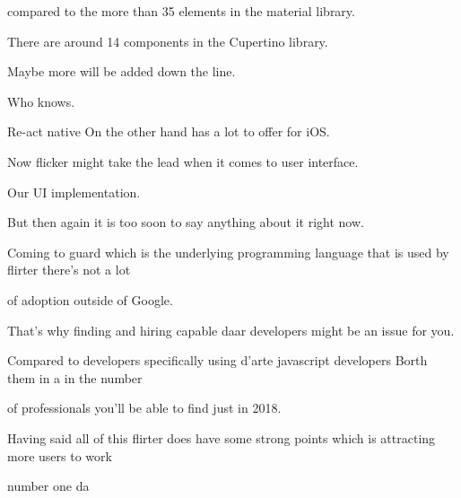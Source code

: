 compared to the more than 35 elements in the material library.

There are around 14 components in the Cupertino library.

Maybe more will be added down the line.

Who knows.

Re-act native On the other hand has a lot to offer for iOS.

Now flicker might take the lead when it comes to user interface.

Our UI implementation.

But then again it is too soon to say anything about it right now.

Coming to guard which is the underlying programming language that is used by flirter there's not a lot

of adoption outside of Google.

That's why finding and hiring capable daar developers might be an issue for you.

Compared to developers specifically using d'arte javascript developers Borth them in a in the number

of professionals you'll be able to find just in 2018.

Having said all of this flirter does have some strong points which is attracting more users to work

number one da